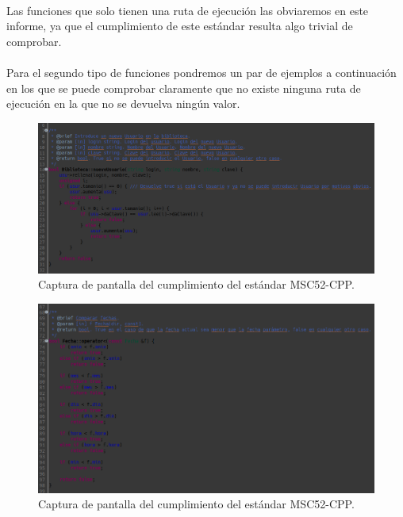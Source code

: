 			\paragraph{}Las funciones que solo tienen una ruta de ejecución las obviaremos en este informe, ya que el cumplimiento de este estándar resulta algo trivial de comprobar.
			
			\paragraph{}Para el segundo tipo de funciones pondremos un par de ejemplos a continuación en los que se puede comprobar claramente que no existe ninguna ruta de ejecución en la que no se devuelva ningún valor.
			
			\begin{figure}[H]
				\centering
				\includegraphics[scale=0.45]{img/captura34.png}
				\caption{Captura de pantalla del cumplimiento del estándar MSC52-CPP.}
				\label{captura34}
			\end{figure}
		
			\begin{figure}[H]
				\centering
				\includegraphics[scale=0.45]{img/captura35.png}
				\caption{Captura de pantalla del cumplimiento del estándar MSC52-CPP.}
				\label{captura35}
			\end{figure}
		
